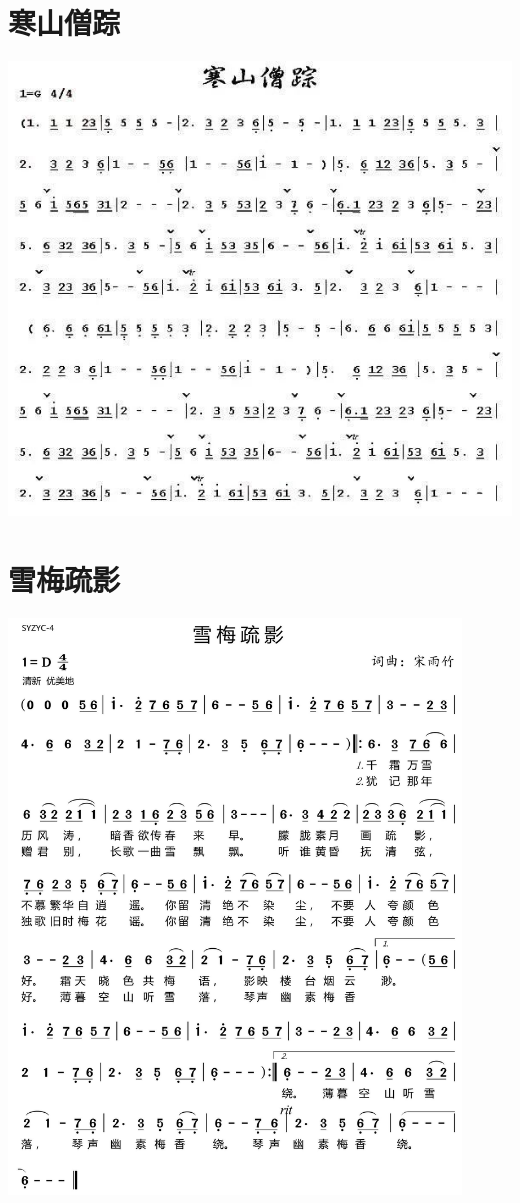 \documentclass[cn,pad,twocol]{elegantbook}
\begin{document}
\section{寒山僧踪}              \includegraphics[width=\textwidth]{dongxiao/20200724-寒山僧踪2}  
\section{雪梅疏影}              \includegraphics[width=0.9\textwidth]{dongxiao/20200725-雪梅疏影}
\end{document}
